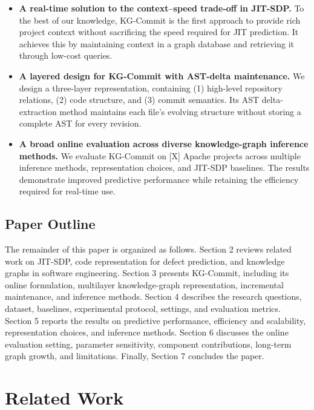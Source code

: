 \documentclass[final,5p,times,twocolumn]{elsarticle}
\theoremstyle{plain}
\begin{document}
\begin{itemize}

\item \textbf{A real-time solution to the context--speed trade-off in JIT-SDP.} To the best of our knowledge, KG-Commit is the first approach to provide rich project context without sacrificing the speed required for JIT prediction. It achieves this by maintaining context in a graph database and retrieving it through low-cost queries.

\item \textbf{A layered design for KG-Commit with AST-delta maintenance.} We design a three-layer representation, containing (1) high-level repository relations, (2) code structure, and (3) commit semantics. Its AST delta-extraction method maintains each file’s evolving structure without storing a complete AST for every revision.

\item \textbf{A broad online evaluation across diverse knowledge-graph inference methods.}
We evaluate KG-Commit on [X] Apache projects across multiple inference methods, representation choices, and JIT-SDP baselines. The results demonstrate improved predictive performance while retaining the efficiency required for real-time use.

\end{itemize}

\subsection{Paper Outline}
The remainder of this paper is organized as follows. Section 2 reviews related work on JIT-SDP, code representation for defect prediction, and knowledge graphs in software engineering. Section 3 presents KG-Commit, including its online formulation, multilayer knowledge-graph representation, incremental maintenance, and inference methods. Section 4 describes the research questions, dataset, baselines, experimental protocol, settings, and evaluation metrics. Section 5 reports the results on predictive performance, efficiency and scalability, representation choices, and inference methods. Section 6 discusses the online evaluation setting, parameter sensitivity, component contributions, long-term graph growth, and limitations. Finally, Section 7 concludes the paper.


\section{Related Work}
\label{sec:related_work}
\end{document}
